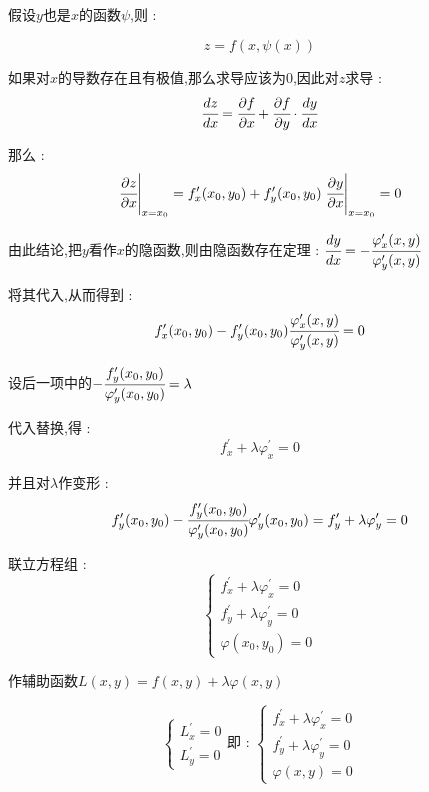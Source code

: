 \documentclass[UTF8,12pt]{ctexbook}
\newcommand{\derivative}{^\prime}
\newcommand{\defFunction}[1]{f(#1)}
\newcommand{\directionDerivative}[3]{\left.\cfrac{\partial #1}{\partial #2}\right|_{#3}}
\newcommand{\partialDerivativeFrac}[2]{\cfrac{\partial #1}{\partial #2}}
\begin{document}
{{{{    假设$y$也是$x$的函数$\psi$,则 :

    $$
      z = \defFunction{x,\psi(x)}
    $$

    如果对$x$的导数存在且有极值,那么求导应该为$0$,因此对$z$求导 :
    $$
      \cfrac{dz}{dx} = \partialDerivativeFrac{f}{x} + \partialDerivativeFrac{f}{y}\cdot\cfrac{dy}{dx}
    $$

    那么 :
    $$
      \directionDerivative{z}{x}{x = x_0} = f\derivative_x(x_0,y_0) + f\derivative_y(x_0,y_0)\directionDerivative{y}{x}{x = x_0} = 0
    $$

    由此结论,把$y$看作$x$的隐函数,则由隐函数存在定理 : $\cfrac{dy}{dx} = -\cfrac{\varphi\derivative_x(x,y)}{\varphi\derivative_y(x,y)}$

    将其代入,从而得到 :
    $$
      f\derivative_x(x_0,y_0) - f\derivative_y(x_0,y_0)\cfrac{\varphi\derivative_x(x,y)}{\varphi\derivative_y(x,y)} = 0
    $$

    设后一项中的$-\cfrac{f\derivative_y(x_0,y_0)}{\varphi\derivative_y(x_0,y_0)} = \lambda$

    代入替换,得 :
    $$
      f\derivative_x + \lambda\varphi\derivative_x = 0
    $$

    并且对$\lambda$作变形 :
    $$
      f\derivative_y(x_0,y_0) - \cfrac{f\derivative_y(x_0,y_0)}{\varphi\derivative_y(x_0,y_0)}\varphi\derivative_y(x_0,y_0) = f\derivative_y + \lambda\varphi\derivative_y = 0
    $$

    联立方程组 :
    $$
      \begin{cases}
        f\derivative_x + \lambda\varphi\derivative_x = 0 \\
        f\derivative_y + \lambda\varphi\derivative_y = 0 \\
        \varphi(x_0,y_0) = 0
      \end{cases}
    $$

    作辅助函数$L(x,y) = \defFunction{x,y} + \lambda\varphi(x,y)$

    $$
      \begin{cases}
        L\derivative_x = 0 \\
        L\derivative_y = 0
      \end{cases}
      \mbox{即 : }
      \begin{cases}
        f\derivative_x + \lambda\varphi\derivative_x = 0 \\
        f\derivative_y + \lambda\varphi\derivative_y = 0 \\
        \varphi(x,y) = 0
      \end{cases}
    $$

}}}}
\end{document}
